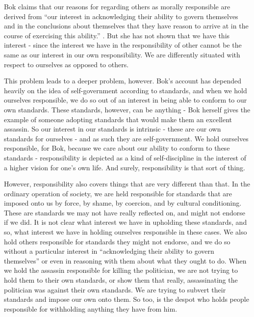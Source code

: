 \documentclass[phd,12pt,oneside,paper=letterpaper]{ubcthesis}
\begin{document}
Bok claims that our reasons for regarding others as morally responsible are derived from ``our interest in acknowledging their ability to govern themselves and in the conclusions about themselves that they have reason to arrive at in the course of exercising this ability.'' \citep{bok1998}. But she has not shown that we have this interest - since the interest we have in the responsibility of other cannot be the same as our interest in our own responsibility. We are differently situated with respect to ourselves as opposed to others.

This problem leads to a deeper problem, however. Bok's account has depended heavily on the idea of self-government according to standards, and when we hold ourselves responsible, we do so out of an interest in being able to conform to our own standards. These standards, however, can be anything - Bok herself gives the example of someone adopting standards that would make them an excellent assassin. So our interest in our standards is intrinsic - these are our own standards for ourselves - and as such they are self-government. We hold ourselves responsible, for Bok, because we care about our ability to conform to these standards - responsibility is depicted as a kind of self-discipline in the interest of a higher vision for one's own life. And surely, responsibility is that sort of thing.

However, responsibility also covers things that are very different than that. In the ordinary operation of society, we are held responsible for standards that are imposed onto us by force, by shame, by coercion, and by cultural conditioning. These are standards we may not have really reflected on, and might not endorse if we did. It is not clear what interest we have in upholding these standards, and so, what interest we have in holding ourselves responsible in these cases. We also hold others responsible for standards they might not endorse, and we do so without a particular interest in ``acknowledging their ability to govern themselves'' or even in reasoning with them about what they ought to do. When we hold the assassin responsible for killing the politician, we are not trying to hold them to their own standards, or show them that really, assassinating the politician was against their own standards. We are trying to subvert their standards and impose our own onto them. So too, is the despot who holds people responsible for withholding anything they have from him.
\end{document}
